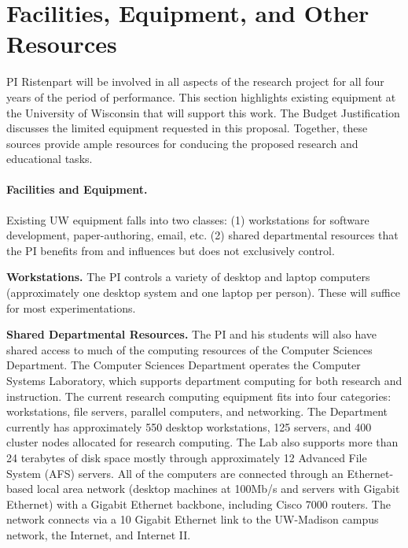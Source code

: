 \documentclass[11pt]{article}
\begin{document}
\section*{Facilities, Equipment, and Other Resources}

PI Ristenpart will be involved in all aspects of the research project for all
four years of the period of performance. This section highlights existing
equipment at the University of Wisconsin that will support this work. The
Budget Justification discusses the limited equipment requested in this
proposal.  Together, these sources provide ample resources for conducing the
proposed research and educational tasks.


\paragraph{Facilities and Equipment.} 
Existing UW equipment falls into two classes: (1) workstations
for software development, paper-authoring, email, etc.
(2) shared departmental resources that the PI benefits from and influences
but does not exclusively control.


\begin{compactenum}
\item {\bf Workstations.} The PI controls a variety of desktop and
laptop computers (approximately one desktop system and one laptop per
person). These will suffice for most experimentations. 


\item {\bf Shared Departmental Resources.} The PI and his students
will also have shared access to much of the computing resources of the
Computer Sciences Department. The Computer Sciences
Department operates the Computer Systems Laboratory, which supports
department computing for both research and instruction. The current
research computing equipment fits into four categories: workstations,
file servers, parallel computers, and networking. The Department
currently has approximately 550 desktop workstations, 125 servers, and
400 cluster nodes allocated for research computing. The Lab also
supports more than 24 terabytes of disk space mostly through
approximately 12 Advanced File System (AFS) servers. All of the
computers are connected through an Ethernet-based local area network
(desktop machines at 100Mb/s and servers with Gigabit Ethernet) with a
Gigabit Ethernet backbone, including Cisco 7000 routers. The network
connects via a 10 Gigabit Ethernet link to the UW-Madison campus
network, the Internet, and Internet II. 
\end{compactenum}
\end{document}
